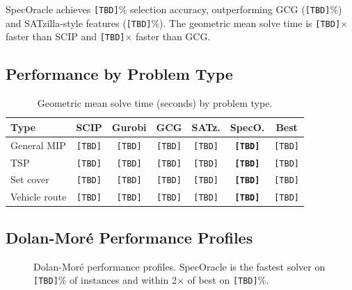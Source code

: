 \documentclass[11pt]{article}
\begin{document}
SpecOracle achieves \texttt{[TBD]}\% selection accuracy, outperforming GCG (\texttt{[TBD]}\%) and SATzilla-style features (\texttt{[TBD]}\%). The geometric mean solve time is \texttt{[TBD]}$\times$ faster than SCIP and \texttt{[TBD]}$\times$ faster than GCG.

\subsection{Performance by Problem Type}

\begin{table}[t]
\centering
\caption{Geometric mean solve time (seconds) by problem type.}
\begin{tabular}{lcccccc}
\toprule
\textbf{Type} & \textbf{SCIP} & \textbf{Gurobi} & \textbf{GCG} & \textbf{SATz.} & \textbf{SpecO.} & \textbf{Best} \\
\midrule
General MIP & \texttt{[TBD]} & \texttt{[TBD]} & \texttt{[TBD]} & \texttt{[TBD]} & \textbf{\texttt{[TBD]}} & \texttt{[TBD]} \\
TSP & \texttt{[TBD]} & \texttt{[TBD]} & \texttt{[TBD]} & \texttt{[TBD]} & \textbf{\texttt{[TBD]}} & \texttt{[TBD]} \\
Set cover & \texttt{[TBD]} & \texttt{[TBD]} & \texttt{[TBD]} & \texttt{[TBD]} & \textbf{\texttt{[TBD]}} & \texttt{[TBD]} \\
Vehicle route & \texttt{[TBD]} & \texttt{[TBD]} & \texttt{[TBD]} & \texttt{[TBD]} & \textbf{\texttt{[TBD]}} & \texttt{[TBD]} \\
\bottomrule
\end{tabular}
\end{table}

\subsection{Dolan-Mor\'e Performance Profiles}

\begin{figure}[t]
\centering
{}
\caption{Dolan-Mor\'e performance profiles. SpecOracle is the fastest solver on \texttt{[TBD]}\% of instances and within 2$\times$ of best on \texttt{[TBD]}\%.}
\label{fig:profile}
\end{figure}
\end{document}
